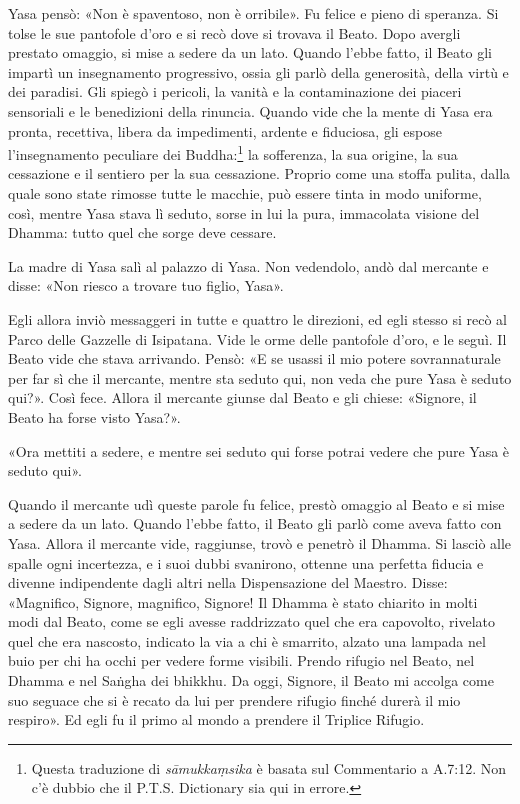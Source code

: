 Yasa pensò: «Non è spaventoso, non è orribile». Fu felice e pieno di speranza.
Si tolse le sue pantofole d’oro e si recò dove si trovava il Beato. Dopo avergli
prestato omaggio, si mise a sedere da un lato. Quando l’ebbe fatto, il Beato gli
impartì un insegnamento progressivo, ossia gli parlò della generosità, della
virtù e dei paradisi. Gli spiegò i pericoli, la vanità e la contaminazione dei
piaceri sensoriali e le benedizioni della rinuncia. Quando vide che la mente di
Yasa era pronta, recettiva, libera da impedimenti, ardente e fiduciosa, gli
espose l’insegnamento peculiare dei Buddha:\footnote{Questa traduzione di
  \emph{sāmukkaṃsika} è basata sul Commentario a A.7:12. Non c’è dubbio che il
  P.T.S. Dictionary sia qui in errore.} la sofferenza, la sua origine, la sua
cessazione e il sentiero per la sua cessazione. Proprio come una stoffa pulita,
dalla quale sono state rimosse tutte le macchie, può essere tinta in modo
uniforme, così, mentre Yasa stava lì seduto, sorse in lui la pura, immacolata
visione del Dhamma: tutto quel che sorge deve cessare.

La madre di Yasa salì al palazzo di Yasa. Non vedendolo, andò dal mercante e
disse: «Non riesco a trovare tuo figlio, Yasa».

Egli allora inviò messaggeri in tutte e quattro le direzioni, ed egli stesso si
recò al Parco delle Gazzelle di Isipatana. Vide le orme delle pantofole d’oro, e
le seguì. Il Beato vide che stava arrivando. Pensò: «E se usassi il mio potere
sovrannaturale per far sì che il mercante, mentre sta seduto qui, non veda che
pure Yasa è seduto qui?». Così fece. Allora il mercante giunse dal Beato e gli
chiese: «Signore, il Beato ha forse visto Yasa?».

«Ora mettiti a sedere, e mentre sei seduto qui forse potrai vedere che pure Yasa
è seduto qui».

Quando il mercante udì queste parole fu felice, prestò omaggio al Beato e si
mise a sedere da un lato. Quando l’ebbe fatto, il Beato gli parlò come aveva
fatto con Yasa. Allora il mercante vide, raggiunse, trovò e penetrò il Dhamma.
Si lasciò alle spalle ogni incertezza, e i suoi dubbi svanirono, ottenne una
perfetta fiducia e divenne indipendente dagli altri nella Dispensazione del
Maestro. Disse: «Magnifico, Signore, magnifico, Signore! Il Dhamma è stato
chiarito in molti modi dal Beato, come se egli avesse raddrizzato quel che era
capovolto, rivelato quel che era nascosto, indicato la via a chi è smarrito,
alzato una lampada nel buio per chi ha occhi per vedere forme visibili. Prendo
rifugio nel Beato, nel Dhamma e nel Saṅgha dei bhikkhu. Da oggi, Signore, il
Beato mi accolga come suo seguace che si è recato da lui per prendere rifugio
finché durerà il mio respiro». Ed egli fu il primo al mondo a prendere il
Triplice Rifugio.

